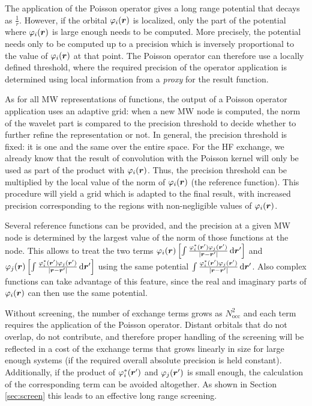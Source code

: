 \documentclass[journal=jctcce, manuscript=article]{achemso}
\begin{document}
The application of the Poisson operator gives a long range potential that decays as $\frac{1}{r}$. However, if the orbital $\varphi_i(\boldsymbol{r})$ is localized, only the part of the potential where $\varphi_i(\boldsymbol{r})$ is large enough needs to be computed. More precisely, the potential needs only to be computed up to a precision which is inversely proportional to the value of $\varphi_i(\boldsymbol{r})$ at that point. The Poisson operator can therefore use a locally defined threshold, where the required precision of the operator application is determined using local information from a \emph{proxy} for the result function.

As for all \ac{MW} representations of functions, the output of a Poisson operator application uses an adaptive grid: when a new \ac{MW} node is computed, the norm of the wavelet part is compared to the precision threshold to decide whether to further refine the representation or not. In general, the precision threshold is fixed: it is one and the same over the entire space. For the \ac{HF} exchange, we already know that the result of convolution with the Poisson kernel will only be used as part of the product with $\varphi_i(\boldsymbol{r})$. Thus, the precision threshold can be multiplied by the local value of the norm of $\varphi_i(\boldsymbol{r})$ (the reference function). This procedure will yield a grid which is adapted to the final result, with increased precision corresponding to the regions with non-negligible values of $\varphi_i(\boldsymbol{r})$.

Several reference functions can be provided, and the precision at a given \ac{MW} node is determined by the largest value of the norm of those functions at the node. This allows to treat the two terms $\varphi_i(\boldsymbol{r}) \left[\int \frac{\varphi^*_i(\boldsymbol{r}')\varphi_j(\boldsymbol{r}')}{|\boldsymbol{r}-\boldsymbol{r}'|} \, \mathrm{d}\boldsymbol{r}'\right]$ and  $\varphi_j(\boldsymbol{r}) \left[\int \frac{\varphi^*_i(\boldsymbol{r}')\varphi_j(\boldsymbol{r}')}{|\boldsymbol{r}-\boldsymbol{r}'|} \, \mathrm{d}\boldsymbol{r}'\right]$ using the same potential $\int \frac{\varphi^*_i(\boldsymbol{r}')\varphi_j(\boldsymbol{r}')}{|\boldsymbol{r}-\boldsymbol{r}'|} \, \mathrm{d}\boldsymbol{r}'$.  Also complex functions can take advantage of this feature, since the real and imaginary parts of $\varphi_i(\boldsymbol{r})$ can then use the same potential.

Without screening, the number of exchange terms grows as $N^2_{\mathrm{occ}}$ and each term requires the application of the Poisson operator. Distant orbitals that do not overlap, do not contribute, and therefore proper handling of the screening will be reflected in a cost of the exchange terms that grows linearly in size for large enough systems (if the required overall absolute precision is held constant). 
Additionally, if the product of $\varphi^*_i(\boldsymbol{r}')$ and $\varphi_j(\boldsymbol{r}')$ is small enough, the calculation of the corresponding term can be avoided altogether. As shown in Section \ref{sec:screen} this leads to an effective long range screening.
\end{document}
